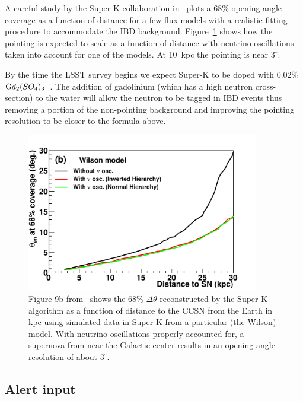 \documentclass[12pt, letterpaper]{article}
\newcommand{\superk}  {Super\nobreakdash-K\xspace}
\begin{document}
A careful study by the \superk collaboration
in~\cite{2016APh....81...39A} plots a 68\% opening angle coverage as a
function of distance for a few flux models with a realistic fitting
procedure to accommodate the IBD
background. Figure~\ref{fig:SK-realtime-pointing-resolution} shows how
the pointing is expected to scale as a function of distance with
neutrino oscillations taken into account for one of the models. At
10~kpc the pointing is near $3^\circ$.

By the time the LSST survey begins we expect \superk to be doped with
0.02\% $\textrm Gd_2(SO_4)_3$~\cite{2004PhRvL..93q1101B}.  The
addition of gadolinium (which has a high neutron cross-section) to the
water will allow the neutron to be tagged in IBD events thus removing
a portion of the non-pointing background and improving the pointing
resolution to be closer to the formula above.

\begin{figure}
  \begin{center}
    \includegraphics[width=4.0in]{dtheta_dist_wilson_all}
    \caption{Figure 9b from~\cite{2016APh....81...39A} shows the 68\%
      $\Delta \theta$ reconstructed by the Super-K algorithm as a
      function of distance to the CCSN from the Earth in kpc using
      simulated data in Super-K from a particular (the Wilson) model.
      With neutrino oscillations properly accounted for, a supernova
      from near the Galactic center results in an opening angle
      resolution of about $3^\circ$.}
    \label{fig:SK-realtime-pointing-resolution}
  \end{center}
\end{figure}

\subsection{Alert input}
\end{document}
